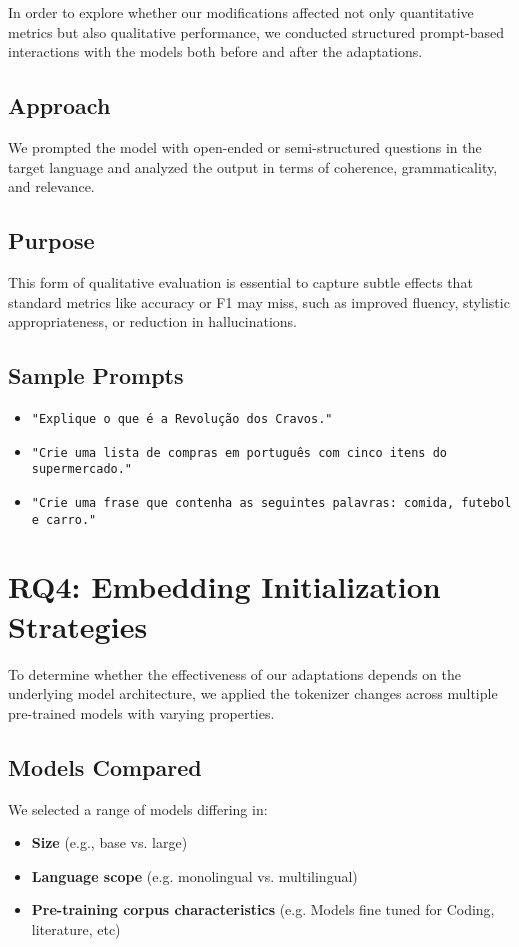 In order to explore whether our modifications affected not only quantitative metrics but also qualitative performance, we conducted structured prompt-based interactions with the models both before and after the adaptations.

\subsection{Approach}
We prompted the model with open-ended or semi-structured questions in the target language and analyzed the output in terms of coherence, grammaticality, and relevance.

\subsection{Purpose}
This form of qualitative evaluation is essential to capture subtle effects that standard metrics like accuracy or F1 may miss, such as improved fluency, stylistic appropriateness, or reduction in hallucinations.

\subsection{Sample Prompts}
\begin{itemize}
    \item \texttt{"Explique o que é a Revolução dos Cravos."}
    \item \texttt{"Crie uma lista de compras em português com cinco itens do supermercado."}
    \item \texttt{"Crie uma frase que contenha as seguintes palavras: comida, futebol e carro."}
\end{itemize}



\section{RQ4: Embedding Initialization Strategies}
\label{sec:model_variation}

To determine whether the effectiveness of our adaptations depends on the underlying model architecture, we applied the tokenizer changes across multiple pre-trained models with varying properties.

\subsection{Models Compared}
We selected a range of models differing in:
\begin{itemize}
    \item \textbf{Size} (e.g., base vs. large)
    \item \textbf{Language scope} (e.g. monolingual vs. multilingual)
    \item \textbf{Pre-training corpus characteristics} (e.g. Models fine tuned for Coding, literature, etc)
\end{itemize}

